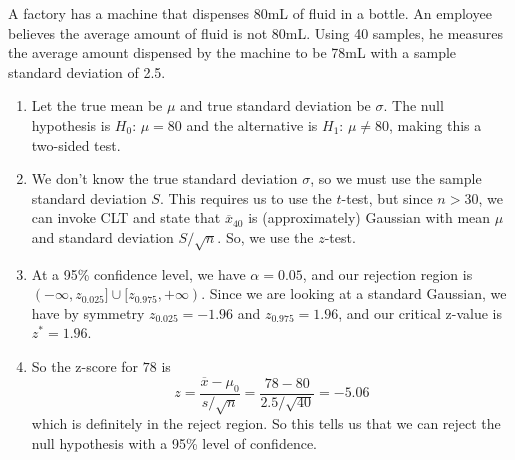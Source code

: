 \documentclass{article}
\begin{document}
    \begin{example}
      A factory has a machine that dispenses 80mL of fluid in a bottle. An employee believes the average amount of fluid is not 80mL. Using 40 samples, he measures the average amount dispensed by the machine to be 78mL with a sample standard deviation of 2.5. 
      \begin{enumerate}
        \item Let the true mean be $\mu$ and true standard deviation be $\sigma$. The null hypothesis is $H_0 : \, \mu = 80$ and the alternative is $H_1 : \, \mu \neq 80$, making this a two-sided test. 
        
        \item We don't know the true standard deviation $\sigma$, so we must use the sample standard deviation $S$. This requires us to use the $t$-test, but since $n > 30$, we can invoke CLT and state that $\overline{x}_{40}$ is (approximately) Gaussian with mean $\mu$ and standard deviation $S / \sqrt{n}$. So, we use the $z$-test. 
        
        \item At a 95\% confidence level, we have $\alpha = 0.05$, and our rejection region is $(-\infty, z_{0.025}] \cup [z_{0.975}, +\infty)$. Since we are looking at a standard Gaussian, we have by symmetry $z_{0.025} = -1.96$ and $z_{0.975} = 1.96$, and our critical z-value is $z^\ast = 1.96$. 
        
        \item So the z-score for $78$ is 
        \begin{equation}
          z = \frac{\overline{x} - \mu_0}{s / \sqrt{n}} = \frac{78 - 80}{2.5 / \sqrt{40}} = -5.06
        \end{equation}
        which is definitely in the reject region. So this tells us that we can reject the null hypothesis with a 95\% level of confidence. 
      \end{enumerate}
    \end{example}
\end{document}
